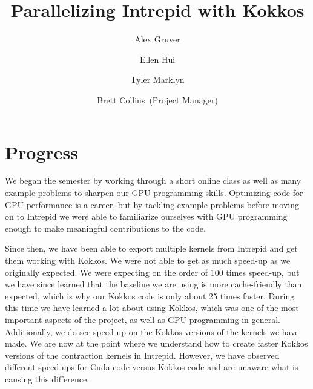\documentclass[midyear]{hmcclinic}
\title{Parallelizing Intrepid with Kokkos}
\author{Alex Gruver \and Ellen Hui \and Tyler Marklyn \and Brett Collins~(Project Manager)}
\begin{document}





\maketitle

\mainmatter




\section*{Progress}
We began the semester by working through a short online class as well as many example
problems to sharpen our GPU programming skills. Optimizing code for GPU
performance is a career, but by tackling example problems before moving on to
Intrepid we were able to familiarize ourselves with GPU programming enough to
make meaningful contributions to the code.

Since then, we have been able to export multiple kernels from Intrepid and get
them working with Kokkos. We were not able to get as much speed-up as we
originally expected. We were expecting on the order of 100 times speed-up, but
we have since learned that the baseline we are using is more cache-friendly than
expected, which is why our Kokkos code is only about 25 times faster. During
this time we have learned a lot about using
Kokkos, which was one of the most important aspects of the project, as well as
GPU programming in general. Additionally, we do see speed-up on the Kokkos
versions of the kernels we have made. We are now at the point where we
understand how to create faster Kokkos versions of the contraction kernels in
Intrepid. However, we have observed different speed-ups for Cuda code versus
Kokkos code and are unaware what is causing this difference.
\end{document}

